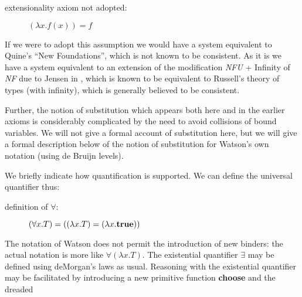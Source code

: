 \documentclass{kluwer}
\begin{document}
\begin{article}
\begin{description}

\item[extensionality axiom not adopted:]  $(\lambda x. f(x)) = f$

\end{description}

If we were to adopt this assumption we would have a system equivalent
to Quine's ``New Foundations'', which is not known to be consistent.
As it is we have a system equivalent to an extension of the
modification {\em NFU\/} + Infinity of {\em NF\/} due to Jensen in
\cite{nfu}, which is known to be equivalent to Russell's theory of
types (with infinity), which is generally believed to be consistent.

Further, the notion of substitution which appears both here and in the
earlier axioms is considerably complicated by the need to avoid
collisions of bound variables.  We will not give a formal account of
substitution here, but we will give a formal description below of the
notion of substitution for Watson's own notation (using de Bruijn
levels).





We briefly indicate how quantification is supported.  
We can define the universal quantifier thus:

\begin{description}

\item[definition of $\forall$:]  $(\forall x.T) = 
	((\lambda x.T) = (\lambda x.{\bf true}))$

\end{description}

The notation of Watson does not permit the introduction of new
binders: the actual notation is more like $\forall(\lambda x.T)$.  The
existential quantifier $\exists$ may be defined using deMorgan's laws as usual.
Reasoning with the existential quantifier may be facilitated by introducing
a new primitive function {\bf choose} and the dreaded


\end{article}
\end{document}
